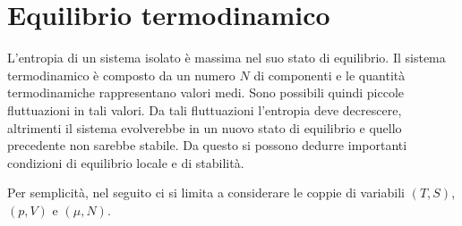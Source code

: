 \chapter{Equilibrio termodinamico}
L'entropia di un sistema isolato è massima nel suo stato di equilibrio. Il sistema termodinamico è composto da un numero $N$ di componenti e le quantità termodinamiche rappresentano valori medi. Sono possibili quindi piccole fluttuazioni in tali valori. Da tali fluttuazioni l'entropia deve decrescere, altrimenti il sistema evolverebbe in un nuovo stato di equilibrio e quello precedente non sarebbe stabile. Da questo si possono dedurre importanti condizioni di equilibrio locale e di stabilità.
\begin{obs}
    Per semplicità, nel seguito ci si limita a considerare le coppie di variabili $(T,S)$, $(p,V)$ e $(\mu,N)$.
\end{obs}

